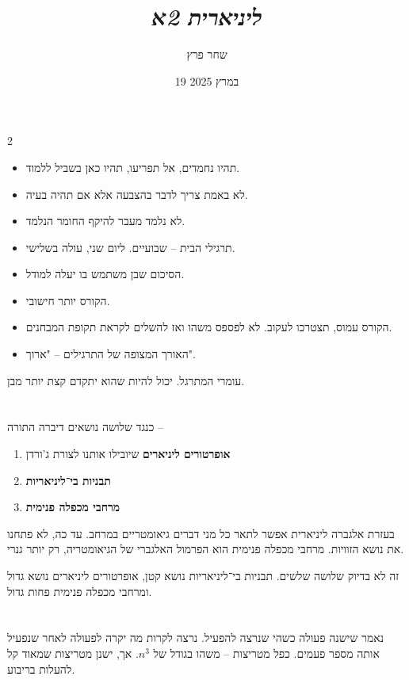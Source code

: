 \documentclass[]{../../../../tex/classes/styledArticle}
\author{שחר פרץ}
\title{\textit{ליניארית 2א}}
\date{19 במרץ 2025}
\begin{document}
	\maketitle
	\section{}
	\begin{multicols}{2}
		\begin{itemize}
			\item תהיו נחמדים, אל תפריעו, תהיו כאן בשביל ללמוד.
			\item לא באמת צריך לדבר בהצבעה אלא אם תהיה בעיה. 
			\item לא נלמד מעבר להיקף החומר הנלמד. 
			\item תרגילי הבית – שבועיים. ליום שני, עולה בשלישי. 
			\item הסיכום שבן משתמש בו יעלה למודל. 
			\item הקורס יותר חישובי. 
			\item הקורס עמוס, תצטרכו לעקוב. לא לפספס משהו ואז  להשלים לקראת תקופת המבחנים. 
			\item האורך המצופה של התרגילים – "ארוך". 
		\end{itemize}
	\end{multicols}
	עומרי המתרגל. יכול להיות שהוא יתקדם קצת יותר מבן. 
	\section{}
	כנגד שלושה נושאים דיברה התורה –
	\begin{enumerate}
		\item \textbf{אופרטורים ליניארים} שיובילו אותנו לצורת ג'ורדן
		\item \textbf{תבניות בי־ליניאריות}
		\item \textbf{מרחבי מכפלה פנימית}
	\end{enumerate}
	בעזרת אלגברה ליניארית אפשר לתאר כל מני דברים גיאומטריים במרחב. עד כה, לא פתחנו את נושא הזוויות. מרחבי מכפלה פנימית הוא הפרמול האלגברי של הגיאומטריה, רק יותר גנרי. 
	
	זה לא בדיוק שלושה שלשים. תבניות בי־ליניאריות נושא קטן, אופרטורים ליניארים נושא גדול ומרחבי מכפלה פנימית פחות גדול. 
	\section{}
	נאמר שישנה פעולה כשהי שנרצה להפעיל. נרצה לקרות מה יקרה לפעולה לאחר שנפעיל אותה מספר פעמים. כפל מטריצות – משהו בגודל של $n^3$. אך, ישנן מטריצות שמאוד קל להעלות בריבוע. 
\end{document}
